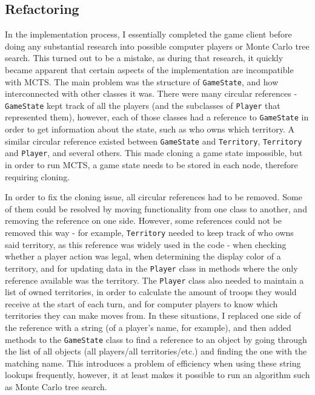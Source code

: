 \subsection{Refactoring}
\label{refactoring}

In the implementation process, I essentially completed the game client before doing any substantial research into possible computer players or Monte Carlo tree search. This turned out to be a mistake, as during that research, it quickly became apparent that certain aspects of the implementation are incompatible with MCTS. The main problem was the structure of \texttt{GameState}, and how interconnected with other classes it was. There were many circular references - \texttt{GameState} kept track of all the players (and the subclasses of \texttt{Player} that represented them), however, each of those classes had a reference to \texttt{GameState} in order to get information about the state, such as who owns which territory. A similar circular reference existed between \texttt{GameState} and \texttt{Territory}, \texttt{Territory} and \texttt{Player}, and several others. This made cloning a game state impossible, but in order to run MCTS, a game state needs to be stored in each node, therefore requiring cloning.

In order to fix the cloning issue, all circular references had to be removed. Some of them could be resolved by moving functionality from one class to another, and removing the reference on one side. However, some references could not be removed this way - for example, \texttt{Territory} needed to keep track of who owns said territory, as this reference was widely used in the code - when checking whether a player action was legal, when determining the display color of a territory, and for updating data in the \texttt{Player} class in methods where the only reference available was the territory. The \texttt{Player} class also needed to maintain a list of owned territories, in order to calculate the amount of troops they would receive at the start of each turn, and for computer players to know which territories they can make moves from. In these situations, I replaced one side of the reference with a string (of a player's name, for example), and then added methods to the \texttt{GameState} class to find a reference to an object by going through the list of all objects (all players/all territories/etc.) and finding the one with the matching name. This introduces a problem of efficiency when using these string lookups frequently, however, it at least makes it possible to run an algorithm such as Monte Carlo tree search.

